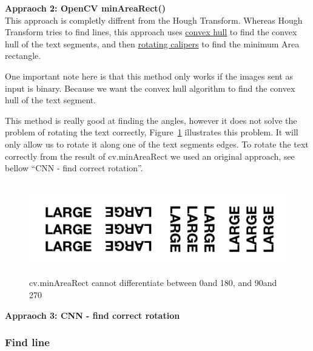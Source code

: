 \documentclass[11pt,a4paper,UKenglish]{article}
\begin{document}
\begin{flushleft}
  \textbf{Appraoch 2: OpenCV minAreaRect()} \\
  This approach is completly diffrent from the Hough Transform.
  Whereas Hough Transform tries to find lines, this approach uses
  \href{https://en.wikipedia.org/wiki/Convex_hull}{convex hull} to find the
  convex hull of the text segments, and then
  \href{https://en.wikipedia.org/wiki/Rotating_calipers}{rotating calipers} to
  find the minimum Area rectangle. \par
  One important note here is that this method only works if the images sent as
  input is binary. Because we want the convex hull algorithm to find the convex
  hull of the text segment. \par
  This method is really good at finding the angles, however it does not solve the
  problem of rotating the text correctly, Figure~\ref{fig:4angle_rot} illustrates
  this problem. It will only allow us to rotate it along one of the text
  segments edges. To rotate the text correctly from the result of cv.minAreaRect
  we used an original approach, see bellow ``CNN - find correct rotation''.
\end{flushleft}

\begin{figure}[H]
  \centering
  \includegraphics[height=4cm]{res/4angle_rot.png}
  \caption{cv.minAreaRect cannot differentiate between 0\textdegree and 180\textdegree, and 90\textdegree and 270\textdegree}
  \label{fig:4angle_rot}
\end{figure}

\begin{flushleft}
  \textbf{Appraoch 3: CNN - find correct rotation} \\
\end{flushleft}





\subsubsection{Find line}
\end{document}
